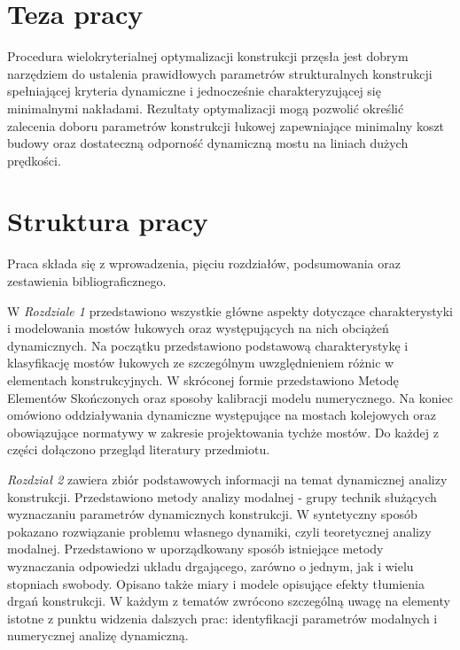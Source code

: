 \section*{Teza pracy}

Procedura wielokryterialnej optymalizacji konstrukcji przęsła jest dobrym narzędziem do ustalenia prawidłowych parametrów strukturalnych konstrukcji spełniającej kryteria dynamiczne i jednocześnie charakteryzującej się minimalnymi nakładami. Rezultaty optymalizacji mogą pozwolić określić zalecenia doboru parametrów konstrukcji łukowej zapewniające minimalny koszt budowy oraz dostateczną odporność dynamiczną mostu na liniach dużych prędkości.




\section*{Struktura pracy}
Praca składa się z wprowadzenia, pięciu rozdziałów, podsumowania oraz zestawienia bibliograficznego. 

W \textit{Rozdziale 1} przedstawiono wszystkie główne aspekty dotyczące charakterystyki i modelowania mostów łukowych oraz występujących na nich obciążeń dynamicznych. Na początku przedstawiono podstawową charakterystykę i klasyfikację mostów łukowych ze szczególnym uwzględnieniem różnic w elementach konstrukcyjnych. W skróconej formie przedstawiono Metodę Elementów Skończonych oraz sposoby kalibracji modelu numerycznego. Na koniec omówiono oddziaływania dynamiczne występujące na mostach kolejowych oraz obowiązujące normatywy w zakresie projektowania tychże mostów. Do każdej z części dołączono przegląd literatury przedmiotu.

\textit{Rozdział 2} zawiera zbiór podstawowych informacji na temat dynamicznej analizy konstrukcji. Przedstawiono metody analizy modalnej - grupy technik służących wyznaczaniu parametrów dynamicznych konstrukcji. W syntetyczny sposób pokazano rozwiązanie problemu własnego dynamiki, czyli teoretycznej analizy modalnej. Przedstawiono w uporządkowany sposób istniejące metody wyznaczania odpowiedzi układu drgającego, zarówno o jednym, jak i wielu stopniach swobody. Opisano także miary i modele opisujące efekty tłumienia drgań konstrukcji. W każdym z tematów zwrócono szczególną uwagę na elementy istotne z punktu widzenia dalszych prac: identyfikacji parametrów modalnych i numerycznej analizę dynamiczną.

